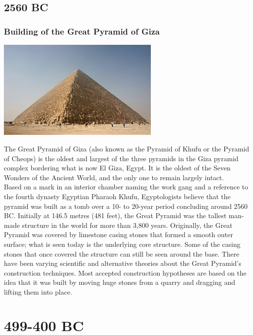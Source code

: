 \documentclass[11pt]{report}
\begin{document}
\chapter{2560 BC}
\section{Building of the Great Pyramid of Giza}
\vspace{2mm}\begin{center}\includegraphics[width=8cm]{./img/greatPyrGiza.jpg}\end{center}
The Great Pyramid of Giza (also known as the Pyramid of Khufu or the Pyramid of Cheops) is the oldest and largest of the three pyramids in the Giza pyramid complex bordering what is now El Giza, Egypt. It is the oldest of the Seven Wonders of the Ancient World, and the only one to remain largely intact.\\
\indent Based on a mark in an interior chamber naming the work gang and a reference to the fourth dynasty Egyptian Pharaoh Khufu, Egyptologists believe that the pyramid was built as a tomb over a 10- to 20-year period concluding around 2560 BC. Initially at 146.5 metres (481 feet), the Great Pyramid was the tallest man-made structure in the world for more than 3,800 years. Originally, the Great Pyramid was covered by limestone casing stones that formed a smooth outer surface; what is seen today is the underlying core structure. Some of the casing stones that once covered the structure can still be seen around the base. There have been varying scientific and alternative theories about the Great Pyramid's construction techniques. Most accepted construction hypotheses are based on the idea that it was built by moving huge stones from a quarry and dragging and lifting them into place.


\part{499-400 BC}
\end{document}

